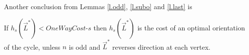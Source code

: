 Another conclusion from Lemmas \ref{l.odd}, \ref{l.subo} and \ref{l.last} is
\begin{corollary}
	If $h_s(\vec{L}^*) < \textit{OneWayCost-s}$ then $h_s(\vec{L}^*)$ is the cost of an optimal orientation of the cycle, unless $n$ is odd and $\vec{L}^*$ reverses direction at each vertex.
\end{corollary}
%
%
%
%
%
